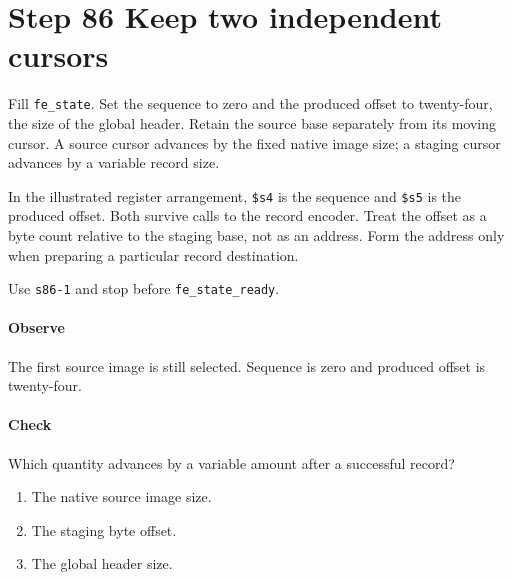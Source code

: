 \section{Step 86 Keep two independent cursors}
Fill \texttt{fe\_state}. Set the sequence to zero and the produced offset to twenty-four, the size of the global header. Retain the source base separately from its moving cursor. A source cursor advances by the fixed native image size; a staging cursor advances by a variable record size.

In the illustrated register arrangement, \texttt{\$s4} is the sequence and \texttt{\$s5} is the produced offset. Both survive calls to the record encoder. Treat the offset as a byte count relative to the staging base, not as an address. Form the address only when preparing a particular record destination.

Use \texttt{s86-1} and stop before \texttt{fe\_state\_ready}.

\paragraph{Observe} The first source image is still selected. Sequence is zero and produced offset is twenty-four.

\paragraph{Check} Which quantity advances by a variable amount after a successful record?
\begin{enumerate}[label=\Alph*.]
\item The native source image size.
\item The staging byte offset.
\item The global header size.
\end{enumerate}
